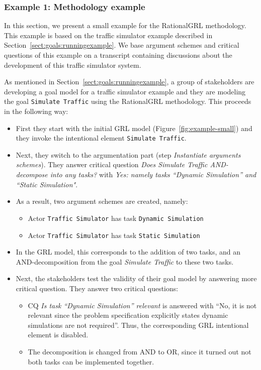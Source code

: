 \subsubsection{Example 1: Methodology example}

In this section, we present a small example for the RationalGRL methodology. This example is based on the traffic simulator example described in Section~\ref{sect:goals:runningexample}. We base argument schemes and critical questions of this example on a transcript containing discussions about the development of this traffic simulator system. %

As mentioned in Section~\ref{sect:goals:runningexample}, a group of stakeholders are developing a goal model for a traffic simulator example and they are modeling the goal \texttt{Simulate Traffic} using the RationalGRL methodology. This proceeds in the following way:
\begin{itemize}
\item
First they start %
with the initial GRL model (Figure~\ref{fig:example-small}) and they invoke the intentional element \texttt{Simulate Traffic}. 
\item Next, they switch to the argumentation part (step \emph{Instantiate arguments schemes}). They answer critical question \emph{Does Simulate Traffic AND-decompose into any tasks?} with \emph{Yes: namely tasks ``Dynamic Simulation'' and ``Static Simulation"}.
\item As a result, two argument schemes are created, namely:
\begin{itemize}
\item Actor \texttt{Traffic Simulator} has task \texttt{Dynamic Simulation}
\item Actor \texttt{Traffic Simulator} has task \texttt{Static Simulation}
\end{itemize}
\item In the GRL model, this corresponds to the addition of two tasks, and an AND-decomposition from the goal \emph{Simulate Traffic} to these two tasks.
\item Next, the stakeholders test the validity of their goal model by answering more critical question. They answer two critical questions:
\begin{itemize}
\item
CQ \emph{Is task ``Dynamic Simulation'' relevant} is answered with ``No, it is not relevant since the problem specification explicitly states dynamic simulations are not required''. Thus, the corresponding GRL intentional element is disabled.
\item The decomposition is changed from AND to OR, since it turned out not both tasks can be implemented together.
\end{itemize}
\end{itemize}

